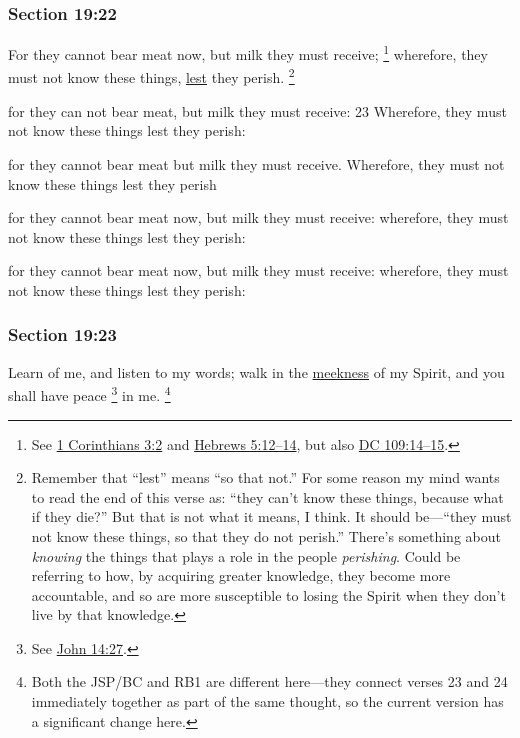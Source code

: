 	\subsubsection{Section 19:22} %
		\label{DC19-22}

		For they cannot bear meat now, but milk they must receive;%
			\footnote{%
				See \hyperref[1CORINTHIANS-3-2]{1 Corinthians 3:2} and \hyperref[HEBREWS-5-12]{Hebrews 5:12--14}, but also \hyperref[DC109-14]{DC 109:14--15}.
				}
		wherefore, they must not know these things, \hyperref[LEST]{lest} they perish.%
			\footnote{%
				Remember that ``lest'' means ``so that not.'' For some reason my mind wants to read the end of this verse as: ``they can't know these things, because what if they die?'' But that is not what it means, I think. It should be---``they must not know these things, so that they do not perish.'' There's something about \textit{knowing} the things that plays a role in the people \textit{perishing}. Could be referring to how, by acquiring greater knowledge, they become more accountable, and so are more susceptible to losing the Spirit when they don't live by that knowledge.
				}

		\begin{framed}
		\scriptsize
			\begin{compactdesc}
				\item[JSP] for they can not bear meat, but milk they must receive: 23 Wherefore, they must not know these things lest they perish:
				\item[RB1] for they cannot bear meat but milk they must receive. Wherefore, they must not know these things lest they perish
				\item[DC 1835] for they cannot bear meat now, but milk they must receive: wherefore, they must not know these things lest they perish: 
				\item[DC 1844] for they cannot bear meat now, but milk they must receive: wherefore, they must not know these things lest they perish: 
			\end{compactdesc}
		\end{framed}

	\subsubsection{Section 19:23} %
		\label{DC19-23}

		Learn of me, and listen to my words; walk in the \hyperref[MEEKNESS]{meekness} of my Spirit, and you shall have peace%
			\footnote{%
				See \hyperref[JOHN-14-27]{John 14:27}.
				}
		in me.%
			\footnote{%
				Both the JSP/BC and RB1 are different here---they connect verses 23 and 24 immediately together as part of the same thought, so the current version has a significant change here.
				}

